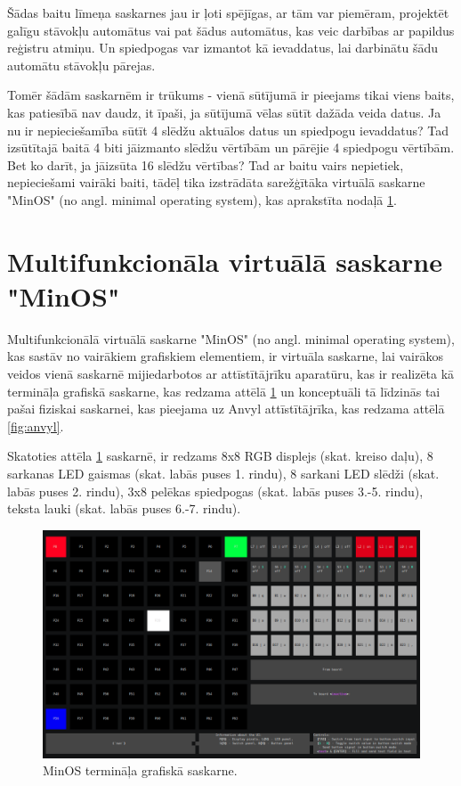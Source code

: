 Šādas baitu līmeņa saskarnes jau ir ļoti spējīgas, ar tām var piemēram,
projektēt galīgu stāvokļu automātus vai pat šādus automātus, kas veic darbības
ar papildus reģistru atmiņu. Un spiedpogas var izmantot kā ievaddatus, lai
darbinātu šādu automātu stāvokļu pārejas.

Tomēr šādām saskarnēm ir trūkums - vienā sūtījumā ir pieejams tikai viens baits,
kas patiesībā nav daudz, it īpaši, ja sūtījumā vēlas sūtīt dažāda veida datus.
Ja nu ir nepieciešamība sūtīt 4 slēdžu aktuālos datus un spiedpogu ievaddatus?
Tad izsūtītajā baitā 4 biti jāizmanto slēdžu vērtībām un pārējie 4 spiedpogu
vērtībām. Bet ko darīt, ja jāizsūta 16 slēdžu vērtības? Tad ar baitu vairs
nepietiek, nepieciešami vairāki baiti, tādēļ tika izstrādāta sarežģītāka
virtuālā saskarne "MinOS" (no angl. minimal operating system), kas aprakstīta
nodaļā \ref{sec:vinminos}.

\section{Multifunkcionāla virtuālā saskarne "MinOS"}
\label{sec:vinminos}

Multifunkcionālā virtuālā saskarne "MinOS" (no angl. minimal operating system),
kas sastāv no vairākiem grafiskiem elementiem, ir virtuāla saskarne, lai
vairākos veidos vienā saskarnē mijiedarbotos ar attīstītājrīku aparatūru, kas ir
realizēta kā termināļa grafiskā saskarne, kas redzama attēlā \ref{fig:minosgui}
un konceptuāli tā līdzinās tai pašai fiziskai saskarnei, kas pieejama uz Anvyl
attīstītājrīka, kas redzama attēlā \ref{fig:anvyl}. 

Skatoties attēla \ref{fig:minosgui} saskarnē, ir redzams 8x8 RGB displejs (skat.
kreiso daļu), 8 sarkanas LED gaismas (skat. labās puses 1. rindu), 8 sarkani LED
slēdži (skat. labās puses 2. rindu), 3x8 pelēkas spiedpogas (skat. labās puses
3.-5. rindu), teksta lauki (skat. labās puses 6.-7. rindu). 

\begin{figure}[H]
    \includegraphics[width=1.0\linewidth]{assets/min-os-execution.png}
    \centering
    \caption{MinOS termināļa grafiskā saskarne.}
    \label{fig:minosgui}
\end{figure}

